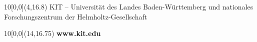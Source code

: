 \begin{titlepage}
\vspace{2cm}


\begin{textblock}{10}[0,0](4,16.8)
\tiny{
		{KIT -- Universität des Landes Baden-Württemberg und nationales Forschungszentrum der Helmholtz-Gesellschaft}
}
\end{textblock}

\begin{textblock}{10}[0,0](14,16.75)
\large{
	\textbf{www.kit.edu}
}
\end{textblock}

\end{titlepage}
